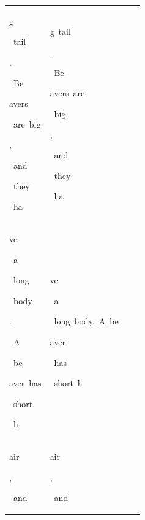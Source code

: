 \begin{table}[h]
\begin{tabular}{ l | l | l | l }
 \colorbox{cm_33!40}{\strut g}\colorbox{cm_28!40}{\strut \ tail}\colorbox{cm_27!40}{\strut .}\colorbox{cm_35!40}{\strut \ Be}\colorbox{cm_40!40}{\strut avers}\colorbox{cm_32!40}{\strut \ are\ big}\colorbox{cm_26!40}{\strut ,}\colorbox{cm_33!40}{\strut \ and}\colorbox{cm_35!40}{\strut \ they}\colorbox{cm_32!40}{\strut \ ha} & \colorbox{cm_12!40}{\strut g\ tail}\colorbox{cm_25!40}{\strut .}\colorbox{cm_0!40}{\strut \ Be}\colorbox{cm_12!40}{\strut avers\ are}\colorbox{cm_0!40}{\strut \ big}\colorbox{cm_12!40}{\strut ,}\colorbox{cm_25!40}{\strut \ and}\colorbox{cm_12!40}{\strut \ they}\colorbox{cm_25!40}{\strut \ ha} &  &  \\ 
 \colorbox{cm_32!40}{\strut ve}\colorbox{cm_31!40}{\strut \ a}\colorbox{cm_36!40}{\strut \ long}\colorbox{cm_31!40}{\strut \ body}\colorbox{cm_24!40}{\strut .}\colorbox{cm_32!40}{\strut \ A}\colorbox{cm_23!40}{\strut \ be}\colorbox{cm_32!40}{\strut aver\ has}\colorbox{cm_40!40}{\strut \ short}\colorbox{cm_19!40}{\strut \ h} & \colorbox{cm_25!40}{\strut ve}\colorbox{cm_38!40}{\strut \ a}\colorbox{cm_12!40}{\strut \ long\ body.\ A\ be}\colorbox{cm_25!40}{\strut aver}\colorbox{cm_12!40}{\strut \ has}\colorbox{cm_0!40}{\strut \ short\ h} &  &  \\ 
 \colorbox{cm_19!40}{\strut air}\colorbox{cm_24!40}{\strut ,}\colorbox{cm_31!40}{\strut \ and} & \colorbox{cm_0!40}{\strut air}\colorbox{cm_12!40}{\strut ,}\colorbox{cm_25!40}{\strut \ and} &  &  \\ 
  \hline 
    \end{tabular}
      \label{tab:data_wikivsc4}
  \end{table}